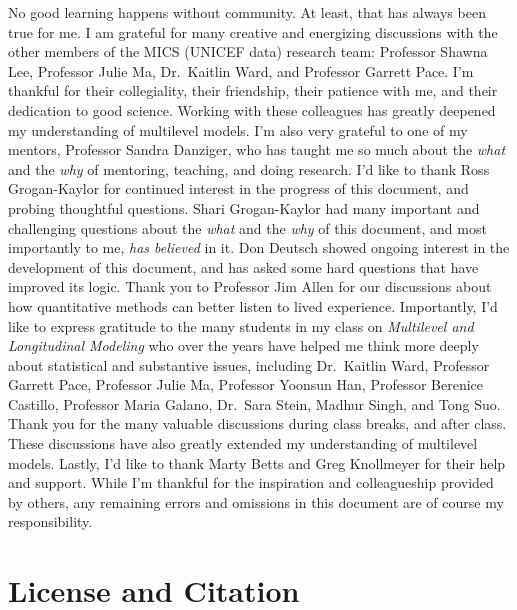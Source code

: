 \documentclass[
  letterpaper,
  DIV=11,
  numbers=noendperiod]{scrreprt}
\begin{document}

No good learning happens without community. At least, that has always
been true for me. I am grateful for many creative and energizing
discussions with the other members of the MICS (UNICEF data) research
team: Professor Shawna Lee, Professor Julie Ma, Dr.~Kaitlin Ward, and
Professor Garrett Pace. I'm thankful for their collegiality, their
friendship, their patience with me, and their dedication to good
science. Working with these colleagues has greatly deepened my
understanding of multilevel models. I'm also very grateful to one of my
mentors, Professor Sandra Danziger, who has taught me so much about the
\emph{what} and the \emph{why} of mentoring, teaching, and doing
research. I'd like to thank Ross Grogan-Kaylor for continued interest in
the progress of this document, and probing thoughtful questions. Shari
Grogan-Kaylor had many important and challenging questions about the
\emph{what} and the \emph{why} of this document, and most importantly to
me, \emph{has believed} in it. Don Deutsch showed ongoing interest in
the development of this document, and has asked some hard questions that
have improved its logic. Thank you to Professor Jim Allen for our
discussions about how quantitative methods can better listen to lived
experience. Importantly, I'd like to express gratitude to the many
students in my class on \emph{Multilevel and Longitudinal Modeling} who
over the years have helped me think more deeply about statistical and
substantive issues, including Dr.~Kaitlin Ward, Professor Garrett Pace,
Professor Julie Ma, Professor Yoonsun Han, Professor Berenice Castillo,
Professor Maria Galano, Dr.~Sara Stein, Madhur Singh, and Tong Suo.
Thank you for the many valuable discussions during class breaks, and
after class. These discussions have also greatly extended my
understanding of multilevel models. Lastly, I'd like to thank Marty
Betts and Greg Knollmeyer for their help and support. While I'm thankful
for the inspiration and colleagueship provided by others, any remaining
errors and omissions in this document are of course my responsibility.


\chapter*{License and Citation}\label{license-and-citation}

\end{document}
